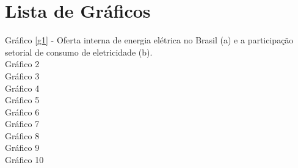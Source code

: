\section*{Lista de Gráficos}
\vspace*{1.5cm} %
\thispagestyle{empty}
    \begin{onehalfspace}
        Gráfico \ref{g1} - Oferta interna de energia elétrica no Brasil (a) e a participação setorial de consumo de eletricidade (b).\\
        Gráfico 2\\
        Gráfico 3\\
        Gráfico 4\\
        Gráfico 5\\
        Gráfico 6\\
        Gráfico 7\\
        Gráfico 8\\
        Gráfico 9\\
        Gráfico 10\\
    \end{onehalfspace}